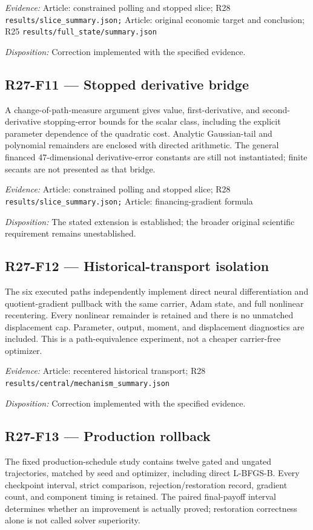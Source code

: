 \emph{Evidence:} Article: constrained polling and stopped slice; R28 \nolinkurl{results/slice_summary.json;} Article: original economic target and conclusion; R25 \nolinkurl{results/full_state/summary.json}

\emph{Disposition:} Correction implemented with the specified evidence.
\subsection{R27-F11 --- Stopped derivative bridge}
A change-of-path-measure argument gives value, first-derivative, and second-derivative stopping-error bounds for the scalar class, including the explicit parameter dependence of the quadratic cost. Analytic Gaussian-tail and polynomial remainders are enclosed with directed arithmetic. The general financed 47-dimensional derivative-error constants are still not instantiated; finite secants are not presented as that bridge.

\emph{Evidence:} Article: constrained polling and stopped slice; R28 \nolinkurl{results/slice_summary.json;} Article: financing-gradient formula

\emph{Disposition:} The stated extension is established; the broader original scientific requirement remains unestablished.
\subsection{R27-F12 --- Historical-transport isolation}
The six executed paths independently implement direct neural differentiation and quotient-gradient pullback with the same carrier, Adam state, and full nonlinear recentering. Every nonlinear remainder is retained and there is no unmatched displacement cap. Parameter, output, moment, and displacement diagnostics are included. This is a path-equivalence experiment, not a cheaper carrier-free optimizer.

\emph{Evidence:} Article: recentered historical transport; R28 \nolinkurl{results/central/mechanism_summary.json}

\emph{Disposition:} Correction implemented with the specified evidence.
\subsection{R27-F13 --- Production rollback}
The fixed production-schedule study contains twelve gated and ungated trajectories, matched by seed and optimizer, including direct L-BFGS-B. Every checkpoint interval, strict comparison, rejection/restoration record, gradient count, and component timing is retained. The paired final-payoff interval determines whether an improvement is actually proved; restoration correctness alone is not called solver superiority.

